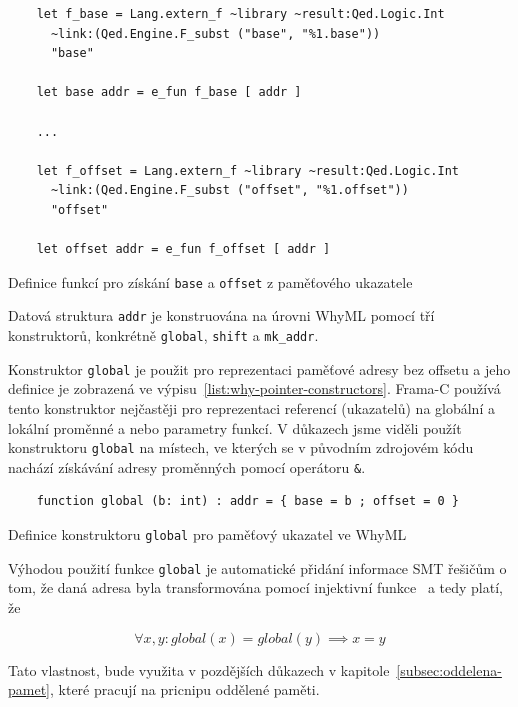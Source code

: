 \begin{listing}[H]
    \begin{verbatim}
    let f_base = Lang.extern_f ~library ~result:Qed.Logic.Int
      ~link:(Qed.Engine.F_subst ("base", "%1.base"))
      "base"

    let base addr = e_fun f_base [ addr ]

    ...

    let f_offset = Lang.extern_f ~library ~result:Qed.Logic.Int
      ~link:(Qed.Engine.F_subst ("offset", "%1.offset"))
      "offset"

    let offset addr = e_fun f_offset [ addr ]
    \end{verbatim}
    \caption{Definice funkcí pro získání \texttt{base} a \texttt{offset} z paměťového ukazatele}
    \label{list:why-addr-base-offset}
\end{listing}

Datová struktura \texttt{addr} je konstruována na úrovni WhyML pomocí tří konstruktorů,
konkrétně \texttt{global}, \texttt{shift} a \texttt{mk\_addr}.

Konstruktor \texttt{global} je použit pro reprezentaci paměťové adresy bez offsetu
a jeho definice je zobrazená ve výpisu~\ref{list:why-pointer-constructors}.
Frama\mbox{-}C používá tento konstruktor nejčastěji
pro reprezentaci referencí (ukazatelů) na globální a lokální proměnné a nebo parametry funkcí.
V důkazech jsme viděli použít konstruktoru \texttt{global} na místech,
ve kterých se v původním zdrojovém kódu nachází získávání adresy proměnných pomocí operátoru \texttt{\&}.

\begin{listing}[H]
    \begin{verbatim}
    function global (b: int) : addr = { base = b ; offset = 0 }
    \end{verbatim}
    \caption{Definice konstruktoru \texttt{global} pro paměťový ukazatel ve WhyML}
    \label{list:why-pointer-constructors}
\end{listing}

Výhodou použití funkce \texttt{global} je automatické přidání informace SMT řešičům o tom,
že daná adresa byla transformována pomocí injektivní funkce~\cite{BlanchardWP2024}
a tedy platí, že

\begin{equation*}
    \forall x, y : global(x) = global(y) \implies x = y
\end{equation*}

Tato vlastnost, bude využita v pozdějších důkazech v kapitole~\ref{subsec:oddelena-pamet},
které pracují na pricnipu oddělené paměti.

